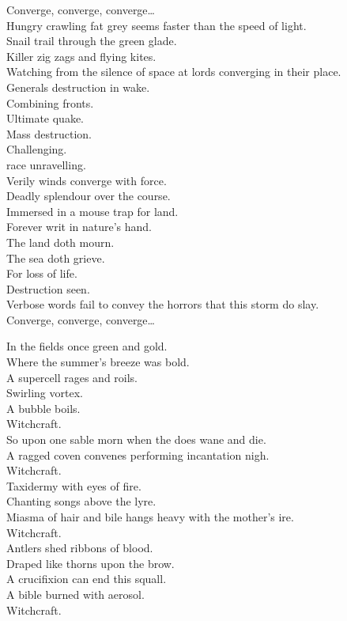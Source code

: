 Converge, converge, converge… \\

Hungry crawling fat grey   seems faster than the speed of light. \\
Snail trail through the green glade. \\
Killer zig zags and flying kites. \\
Watching from the silence of space at lords converging in their place. \\
Generals destruction in wake. \\
Combining fronts. \\
Ultimate quake. \\

Mass destruction. \\
Challenging. \\
 race unravelling. \\

Verily winds converge with force. \\
Deadly splendour over the course. \\
Immersed in a mouse trap for land. \\
Forever writ in nature's hand. \\
The land doth mourn. \\
The sea doth grieve. \\
For loss of life. \\
Destruction seen. \\
Verbose words fail to convey the horrors that this storm do slay. \\

Converge, converge, converge… \\



In the fields once green and gold. \\
Where the summer's breeze was bold. \\
A supercell rages and roils. \\
Swirling vortex. \\
A bubble boils. \\
Witchcraft. \\
So upon one sable morn when the  does wane and die. \\
A ragged coven convenes performing incantation nigh. \\
Witchcraft. \\
Taxidermy with eyes of fire. \\
Chanting songs above the lyre. \\
Miasma of hair and bile hangs heavy with the mother's ire. \\
Witchcraft. \\
Antlers shed ribbons of blood. \\
Draped like thorns upon the brow. \\
A crucifixion can end this squall. \\
A bible burned with aerosol. \\
Witchcraft. \\

